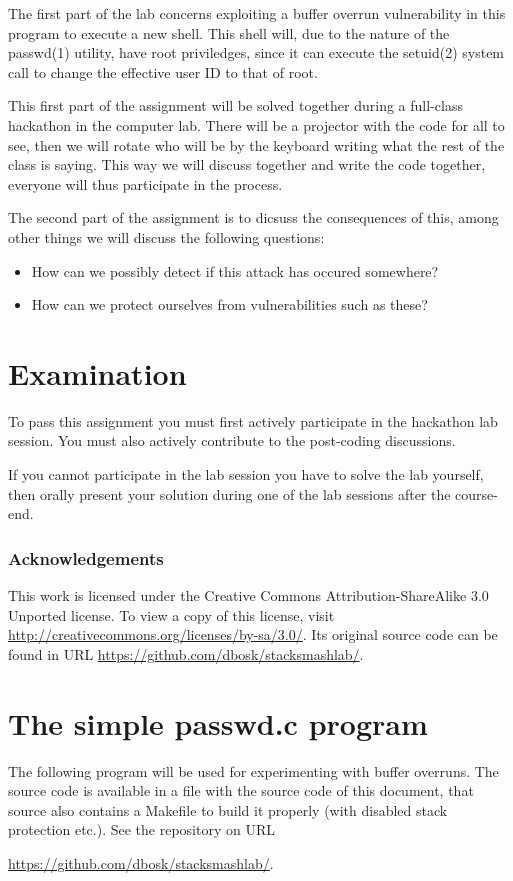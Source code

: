 The first part of the lab concerns exploiting a buffer overrun vulnerability in 
this program to execute a new shell.
This shell will, due to the nature of the passwd(1) utility, have root 
priviledges, since it can execute the setuid(2) system call to change the 
effective user ID to that of root.

This first part of the assignment will be solved together during a full-class 
hackathon in the computer lab.
There will be a projector with the code for all to see, then we will rotate who 
will be by the keyboard writing what the rest of the class is saying.
This way we will discuss together and write the code together, everyone will 
thus participate in the process.

The second part of the assignment is to dicsuss the consequences of this, among 
other things we will discuss the following questions:
\begin{itemize}
  \item How can we possibly detect if this attack has occured somewhere?
  \item How can we protect ourselves from vulnerabilities such as these?
\end{itemize}


\section{Examination}
\label{sec:exam}
To pass this assignment you must first actively participate in the hackathon 
lab session.
You must also actively contribute to the post-coding discussions.

If you cannot participate in the lab session you have to solve the lab 
yourself, then orally present your solution during one of the lab sessions 
after the course-end.


\subsubsection*{Acknowledgements}

This work is licensed under the Creative Commons Attribution-ShareAlike 3.0 
Unported license.
To view a copy of this license, visit 
\url{http://creativecommons.org/licenses/by-sa/3.0/}.
Its original source code can be found in URL 
\url{https://github.com/dbosk/stacksmashlab/}.


\printbibliography


\appendix
\section{The simple passwd.c program}
\label{app:passwdsrc}
The following program will be used for experimenting with buffer overruns.
The source code is available in a file with the source code of this document, 
that source also contains a Makefile to build it properly (with disabled stack 
protection etc.).
See the repository on URL
\begin{center}
  \url{https://github.com/dbosk/stacksmashlab/}.
\end{center}



